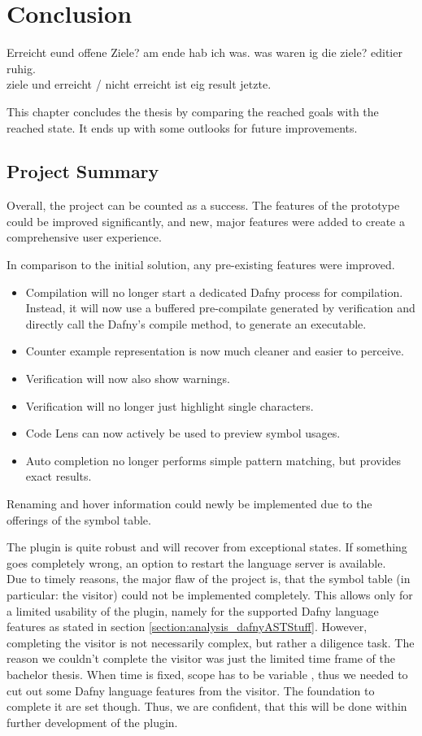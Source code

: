 \section{Conclusion}
\label{section:conclusion}
Erreicht eund offene Ziele? am ende hab ich was. was waren ig die ziele? editier ruhig. \\
ziele und erreicht / nicht erreicht ist eig result jetzte.


This chapter concludes the thesis by comparing the reached goals with the reached state.
It ends up with some outlooks for future improvements.

\subsection{Project Summary}
Overall, the project can be counted as a success.
The features of the prototype could be improved significantly, and new, major features were added to create a comprehensive user experience.

In comparison to the initial solution, any pre-existing features were improved.
\begin{itemize}
 \item Compilation will no longer start a dedicated Dafny process for compilation. Instead, it will now use a buffered pre-compilate generated by verification and directly call the Dafny's compile method, to generate an executable.
 \item Counter example representation is now much cleaner and easier to perceive.
 \item Verification will now also show warnings.
 \item Verification will no longer just highlight single characters.
 \item Code Lens can now actively be used to preview symbol usages.
 \item Auto completion no longer performs simple pattern matching, but provides exact results.
\end{itemize}
Renaming and hover information could newly be implemented due to the offerings of the symbol table.

The plugin is quite robust and will recover from exceptional states.
If something goes completely wrong, an option to restart the language server is available.\\

Due to timely reasons, the major flaw of the project is, that the symbol table (in particular: the visitor) could not be implemented completely.
This allows only for a limited usability of the plugin, namely for the supported Dafny language features as stated in section \ref{section:analysis_dafnyASTStuff}.
However, completing the visitor is not necessarily complex, but rather a diligence task.
The reason we couldn't complete the visitor was just the limited time frame of the bachelor thesis.
When time is fixed, scope has to be variable \cite{keller}, thus we needed to cut out some Dafny language features from the visitor.
The foundation to complete it are set though.
Thus, we are confident, that this will be done within further development of the plugin.\\

